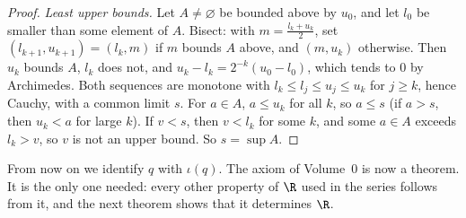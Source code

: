 \begin{proof}
\emph{Least upper bounds.} Let $A\ne\varnothing$ be bounded above by $u_0$, and let $l_0$ be smaller than some element of $A$. Bisect: with
$m=\frac{l_k+u_k}2$, set $(l_{k+1},u_{k+1})=(l_k,m)$ if $m$ bounds $A$ above, and $(m,u_k)$ otherwise. Then $u_k$ bounds $A$, $l_k$ does not, and
$u_k-l_k=2^{-k}(u_0-l_0)$, which tends to $0$ by Archimedes. Both sequences are monotone with $l_k\le l_j\le u_j\le u_k$ for $j\ge k$, hence Cauchy,
with a common limit $s$. For $a\in A$, $a\le u_k$ for all $k$, so $a\le s$ (if $a>s$, then $u_k<a$ for large $k$). If $v<s$, then $v<l_k$ for some
$k$, and some $a\in A$ exceeds $l_k>v$, so $v$ is not an upper bound. So $s=\sup A$.
\end{proof}

From now on we identify $q$ with $\iota(q)$. The axiom of Volume~0 is now a theorem. It is the only one needed: every
other property of $\R$ used in the series follows from it, and the next theorem shows that it determines $\R$.

